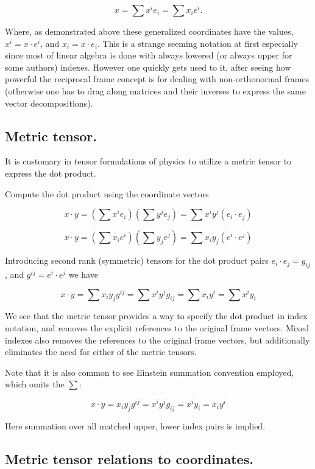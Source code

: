 \documentclass{article}      %
\begin{document}
\[
x = \sum x^i e_i = \sum x_i e^i.
\]

Where, as demonstrated above these generalized coordinates have the values, $x^i = x \cdot e^i$, and $x_i = x \cdot e_i$.  This is a strange seeming notation at
first especially since most of linear algebra is done with always lowered (or always upper for some authors) indexes.  However one quickly gets used to it, after seeing how powerful the reciprocal frame concept is for dealing with non-orthonormal frames (otherwise one has to drag along matrices and their inverses to express the same vector decompositions).

\subsection{ Metric tensor. }

It is customary in tensor formulations of physics to utilize a metric tensor to express the dot product.

Compute the dot product using the coordinate vectors

\[
x \cdot y = \left(\sum x^i e_i \right)\left(\sum y^j e_j \right) = \sum x^i y^j \left( e_i \cdot e_j \right)
\]

\[
x \cdot y = \left(\sum x_i e^i \right)\left(\sum y_j e^j \right) = \sum x_i y_j \left( e^i \cdot e^j \right)
\]

Introducing second rank (symmetric) tensors for the dot product pairs $ e_i \cdot e_j = g_{ij}$, and $ g^{ij} = e^i \cdot e^j $ we have

\[
x \cdot y = \sum x_i y_j g^{ij} = \sum x^i y^j g_{ij} = \sum x_i y^i = \sum x^i y_i
\]

We see that the metric tensor provides a way to specify the dot product in index notation, and removes the explicit references to the original frame vectors.  Mixed indexes also removes the references to the original frame vectors, but additionally eliminates the need for either of the metric tensors.

Note that it is also common to see Einstein summation convention employed, which omits the $\sum$:

\[
x \cdot y = x_i y_j g^{ij} = x^i y^j g_{ij} = x^i y_i = x_i y^i
\]

Here summation over all matched upper, lower index pairs is implied.

\subsection{ Metric tensor relations to coordinates. }
\end{document}
